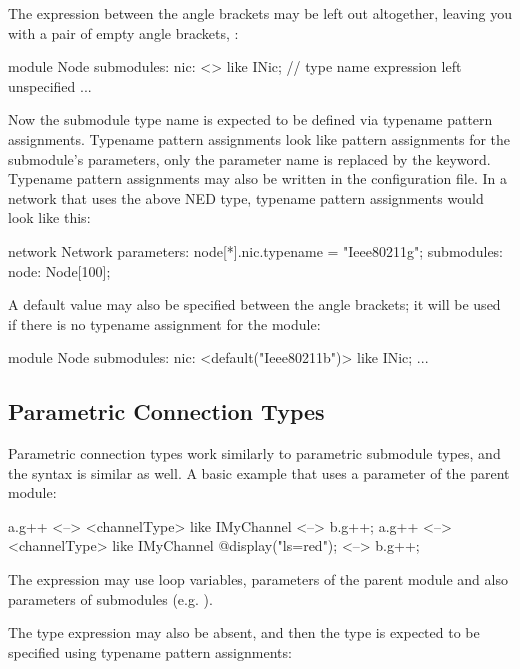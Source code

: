 The expression between the angle brackets may be left out altogether,
leaving you with a pair of empty angle brackets, \ttt{<>}:

\begin{ned}
module Node
{
    submodules:
        nic: <> like INic;  // type name expression left unspecified
        ...
}
\end{ned}

Now the submodule type name is expected to be defined via typename pattern
assignments. Typename pattern assignments look like pattern assignments for
the submodule's parameters, only the parameter name is replaced by the
 keyword. Typename pattern assignments may also be
written in the configuration file. In a network that uses the above
 NED type, typename pattern assignments would look like this:

\begin{ned}
network Network
{
    parameters:
        node[*].nic.typename = "Ieee80211g";
    submodules:
        node: Node[100];
}
\end{ned}

A default value may also be specified between the angle brackets;
it will be used if there is no typename assignment for the
module:

\begin{ned}
module Node
{
    submodules:
        nic: <default("Ieee80211b")> like INic;
        ...
}
\end{ned}


\subsection{Parametric Connection Types}
\label{sec:ch-ned-lang:connection-like}

Parametric connection types work similarly to parametric submodule types,
and the syntax is similar as well. A basic example that uses a parameter of
the parent module:

\begin{ned}
a.g++ <--> <channelType> like IMyChannel <--> b.g++;
a.g++ <--> <channelType> like IMyChannel {@display("ls=red");} <--> b.g++;
\end{ned}

The expression may use loop variables, parameters of the parent module
and also parameters of submodules (e.g. ).

The type expression may also be absent, and then the type is expected to be
specified using typename pattern assignments:

